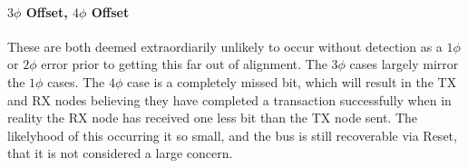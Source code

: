 \paragraph{$3\phi$ Offset, $4\phi$ Offset}
These are both deemed extraordiarily unlikely to occur without detection as a
$1\phi$ or $2\phi$ error prior to getting this far out of alignment. The
$3\phi$ cases largely mirror the $1\phi$ cases. The $4\phi$ case is a
completely missed bit, which will result in the TX and RX nodes believing they
have completed a transaction successfully when in reality the RX node has
received one less bit than the TX node sent. The likelyhood of this occurring
it so small, and the bus is still recoverable via Reset, that it is not
considered a large concern.
